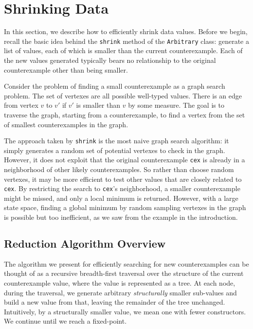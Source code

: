 \documentclass[10pt]{sigplanconf}
\newcommand{\ttp}[1]{\texttt{#1}}
\begin{document}

\section{Shrinking Data}\label{sec:shrinking}
In this section, we describe how to efficiently shrink data values.  Before we
begin, recall the basic idea behind the \ttp{shrink} method of the
\ttp{Arbitrary} class: generate a list of values, each of which is smaller than
the current counterexample.  Each of the new values generated typically bears no
relationship to the original counterexample other than being smaller.

Consider the problem of finding a small counterexample as a graph search
problem.  The set of vertexes are all possible well-typed values.  There is an
edge from vertex $v$ to $v'$ if $v'$ is smaller than $v$ by some measure.  The
goal is to traverse the graph, starting from a counterexample, to find a vertex
from the set of smallest counterexamples in the graph.

The approach taken by \ttp{shrink} is the most naive graph search algorithm: it
simply generates a random set of potential vertexes to check in the graph.
However, it does not exploit that the original counterexample \ttp{cex} is
already in a neighborhood of other likely counterexamples.  So rather than
choose random vertexes, it may be more efficient to test other values that are
closely related to \ttp{cex}.  By restricting the search to \ttp{cex}'s
neighborhood, a smaller counterexample might be missed, and only a local minimum
is returned.  However, with a large state space, finding a global minimum by
random sampling vertexes in the graph is possible but too inefficient, as we saw
from the example in the introduction.

\subsection{Reduction Algorithm Overview}\label{sec:reduct}
The algorithm we present for efficiently searching for new counterexamples can
be thought of as a recursive breadth-first traversal over the structure of the
current counterexample value, where the value is represented as a tree.  At each
node, during the traversal, we generate arbitrary \emph{structurally} smaller
sub-values and build a new value from that, leaving the remainder of the tree
unchanged.  Intuitively, by a structurally smaller value, we mean one with fewer
constructors.  We continue until we reach a fixed-point.
\end{document}
